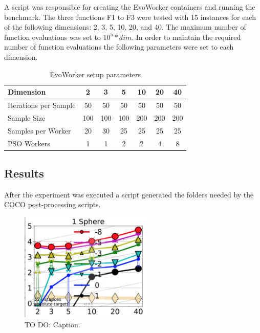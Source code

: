 A script was responsible for creating the EvoWorker 
containers and running the benchmark. The three functions 
F1 to F3 were tested with 15 instances for each of 
the following dimensions:  2, 3, 5, 10, 20, and 40. 
The maximum number of function evaluations was set to $10^5*dim$. 
In order to maintain the required number of function 
evaluations the following parameters were set to each dimension.

\begin{table}
  \small
  \caption{ EvoWorker setup parameters }
  \label{tab:params} 
  \centering
  \small
  \begin{tabular}{|l|c|c|c|c|c|c|}
    \hline\noalign{\smallskip}
    Dimension & 2 & 3 & 5 & 10 & 20 & 40\\\hline
    Iterations per Sample  & 50 & 50 & 50 & 50 & 50 & 50\\ \hline
    Sample Size  & 100 & 100 & 100 & 200 & 200 & 200 \\ \hline
    Samples per Worker & 20 & 30 & 25 & 25 & 25 & 25  \\ \hline
    PSO Workers & 1 & 1 & 2 & 2 & 4 & 8  \\ \hline
  \end{tabular}
\end{table}





\subsection{Results}
\label{sec:results}
After the experiment was executed a script generated 
the folders needed by the COCO post-processing scripts.

\begin{figure}[!t]
    \centering
        \includegraphics[width=2.5in]{img/Sphere.png}
    \caption{ TO DO: Caption.}
    \label{fig:sphere}
\end{figure}


